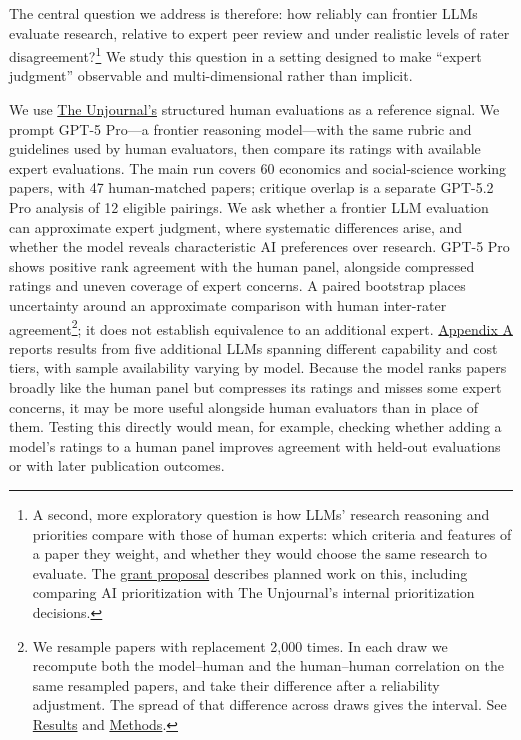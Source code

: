 \documentclass[
  11pt,
  letterpaper,
]{article}
\begin{document}
The central question we address is therefore: how reliably can frontier
LLMs evaluate research, relative to expert peer review and under
realistic levels of rater disagreement?\footnote{A second, more
  exploratory question is how LLMs' research reasoning and priorities
  compare with those of human experts: which criteria and features of a
  paper they weight, and whether they would choose the same research to
  evaluate. The
  \href{https://llm-uj-research-eval-project.netlify.app/proposal.html}{grant
  proposal} describes planned work on this, including comparing AI
  prioritization with The Unjournal's internal prioritization decisions.}
We study this question in a setting designed to make ``expert judgment''
observable and multi-dimensional rather than implicit.

We use \href{https://www.unjournal.org/}{The Unjournal's} structured
human evaluations as a reference signal. We prompt GPT-5 Pro---a
frontier reasoning model---with the same rubric and guidelines used by
human evaluators, then compare its ratings with available expert
evaluations. The main run covers 60 economics and social-science working
papers, with 47 human-matched papers; critique overlap is a separate
GPT-5.2 Pro analysis of 12 eligible pairings. We ask whether a frontier
LLM evaluation can approximate expert judgment, where systematic
differences arise, and whether the model reveals characteristic AI
preferences over research. GPT-5 Pro shows positive rank agreement with
the human panel, alongside compressed ratings and uneven coverage of
expert concerns. A paired bootstrap places uncertainty around an
approximate comparison with human inter-rater agreement\footnote{We
  resample papers with replacement 2,000 times. In each draw we
  recompute both the model--human and the human--human correlation on
  the same resampled papers, and take their difference after a
  reliability adjustment. The spread of that difference across draws
  gives the interval. See \href{results.qmd}{Results} and
  \href{methods.qmd}{Methods}.}; it does not establish equivalence to an
additional expert. \href{results_ratings.qmd}{Appendix A} reports
results from five additional LLMs spanning different capability and cost
tiers, with sample availability varying by model. Because the model
ranks papers broadly like the human panel but compresses its ratings and
misses some expert concerns, it may be more useful alongside human
evaluators than in place of them. Testing this directly would mean, for
example, checking whether adding a model's ratings to a human panel
improves agreement with held-out evaluations or with later publication
outcomes.
\end{document}

